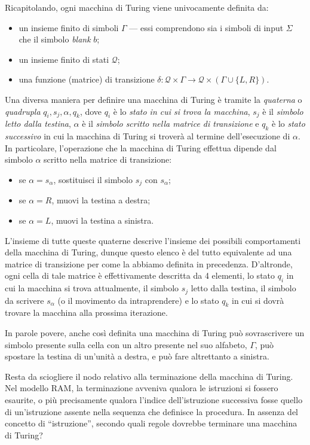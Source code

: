 \documentclass[10pt]{\classname}
\theoremstyle{newlinethm}
\theoremstyle{theorem}
\theoremstyle{definition}
\theoremstyle{definition}
\theoremstyle{definition}
\theoremstyle{definition}
\begin{document}
Ricapitolando, ogni macchina di Turing viene univocamente definita da:
\begin{itemize}
    \item un insieme finito di simboli $\Gamma$ --- essi comprendono sia i
        simboli di input $\Sigma$ che il simbolo \emph{blank} $b$;
    \item un insieme finito di stati $\mathcal Q$;
    \item una funzione (matrice) di transizione $\delta  : \mathcal Q \times
        \Gamma \rightarrow \mathcal Q \times (\Gamma \cup \{L,R\})$.
\end{itemize}

Una diversa maniera per definire una macchina di Turing è tramite la
\emph{quaterna} o \emph{quadrupla} $q_i, s_j, \alpha, q_k$, dove $q_i$ è lo
\emph{stato in cui si trova la macchina}, $s_j$ è il \emph{simbolo letto dalla
testina}, $\alpha$ è il \emph{simbolo scritto nella matrice di transizione} e
$q_k$ è lo \emph{stato successivo} in cui la macchina di Turing si troverà al
termine dell'esecuzione di $\alpha$. In particolare, l'operazione che la
macchina di Turing effettua dipende dal simbolo $\alpha$ scritto nella matrice
di transizione:
\begin{itemize}
    \item se $\alpha = s_\alpha$, sostituisci il simbolo $s_j$ con $s_\alpha$;
    \item se $\alpha = R$, muovi la testina a destra;
    \item se $\alpha = L$, muovi la testina a sinistra.
\end{itemize}

L'insieme di tutte queste quaterne descrive l'insieme dei possibili
comportamenti della macchina di Turing, dunque questo elenco è del tutto
equivalente ad una matrice di transizione per come la abbiamo definita in
precedenza. D'altronde, ogni cella di tale matrice è effettivamente descritta da 4 elementi, lo stato $q_i$ in cui la macchina si trova attualmente, il simbolo $s_j$ letto dalla testina, il simbolo da scrivere $s_\alpha$ (o il movimento da intraprendere) e lo stato $q_k$ in cui si dovrà trovare la macchina alla prossima iterazione.

In parole povere, anche così definita una macchina di Turing può sovrascrivere
un simbolo presente sulla cella con un altro presente nel suo alfabeto,
$\Gamma$, può spostare la testina di un'unità a destra, e può fare altrettanto
a sinistra.

Resta da sciogliere il nodo relativo alla terminazione della macchina di Turing.
Nel modello RAM, la terminazione avveniva qualora le istruzioni si fossero
esaurite, o più precisamente qualora l'indice dell'istruzione successiva fosse
quello di un'istruzione assente nella sequenza che definisce la procedura. In
assenza del concetto di ``istruzione'', secondo quali regole dovrebbe terminare
una macchina di Turing?
\end{document}
